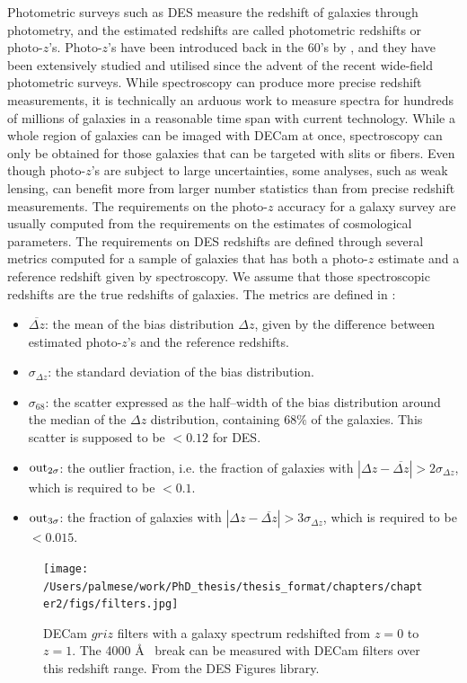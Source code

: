 Photometric surveys such as DES measure the redshift of galaxies through photometry, and the estimated redshifts are called photometric redshifts or photo-$z$'s. Photo-$z$'s have been introduced back in the 60's by \citet{baum}, and they have been extensively studied and utilised since the advent of the recent wide-field photometric surveys. While spectroscopy can produce more precise redshift measurements, it is technically an arduous work to measure spectra for hundreds of millions of galaxies in a reasonable time span with current technology. While a whole region of galaxies can be imaged with DECam at once, spectroscopy can only be obtained for those galaxies that can be targeted with slits or fibers. Even though photo-$z$'s are subject to large uncertainties, some analyses, such as weak lensing, can benefit more from larger number statistics than from precise redshift measurements. The requirements on the photo-$z$ accuracy for a galaxy survey are usually computed from the requirements on the estimates of cosmological parameters. The requirements on DES redshifts are defined through several metrics computed for a sample of galaxies that has both a photo-$z$ estimate and a reference redshift given by spectroscopy. We assume that those spectroscopic redshifts are the true redshifts of galaxies. The metrics are defined in \citet{sanchez}:
\begin{itemize}
\item $\overline{\Delta z}$: the mean of the bias distribution $\Delta z$, given by the difference between estimated photo-$z$'s and the reference redshifts.
\item $\sigma_{\Delta z}$: the standard deviation of the bias distribution.
\item $\sigma_{68}$: the scatter expressed as the half--width of the bias distribution around the median of the $\Delta z$ distribution, containing $68\%$ of the galaxies. This scatter is supposed to be $<0.12$ for DES.
\item ${\rm out}_{2\sigma}$: the outlier fraction, i.e. the fraction of galaxies with $|\Delta z - \overline{\Delta z}|>2\sigma_{\Delta z}$, which is required to be $<0.1$.
\item ${\rm out}_{3\sigma}$: the fraction of galaxies with $|\Delta z - \overline{\Delta z}|>3\sigma_{\Delta z}$, which is required to be $<0.015$.
\end{itemize}

\begin{figure}\centering
\texttt{[image: /Users/palmese/work/PhD\_thesis/thesis\_format/chapters/chapter2/figs/filters.jpg]}\caption{DECam $griz$ filters with a galaxy spectrum redshifted from $z=0$ to $z=1$. The 4000 \AA~ break can be measured with DECam filters over this redshift range. From the DES Figures library.}\label{fig:filtersz}
\end{figure}

